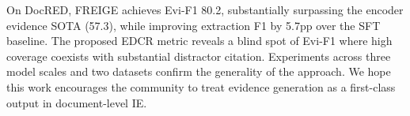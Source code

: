 \documentclass[11pt,a4paper]{article}
\newcommand{\method}{FREIGE}
\begin{document}
On DocRED, \method{} achieves Evi-F1 80.2, substantially surpassing the encoder evidence SOTA (57.3), while improving extraction F1 by 5.7pp over the SFT baseline. The proposed EDCR metric reveals a blind spot of Evi-F1 where high coverage coexists with substantial distractor citation. Experiments across three model scales and two datasets confirm the generality of the approach. We hope this work encourages the community to treat evidence generation as a first-class output in document-level IE.


\end{document}
